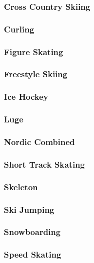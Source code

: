 			\subsubsection{Cross Country Skiing}
			\subsubsection{Curling}
			\subsubsection{Figure Skating}
			\subsubsection{Freestyle Skiing}
			\subsubsection{Ice Hockey}
			\subsubsection{Luge}
			\subsubsection{Nordic Combined}
			\subsubsection{Short Track Skating}
			\subsubsection{Skeleton}
			\subsubsection{Ski Jumping}
			\subsubsection{Snowboarding}
			\subsubsection{Speed Skating}